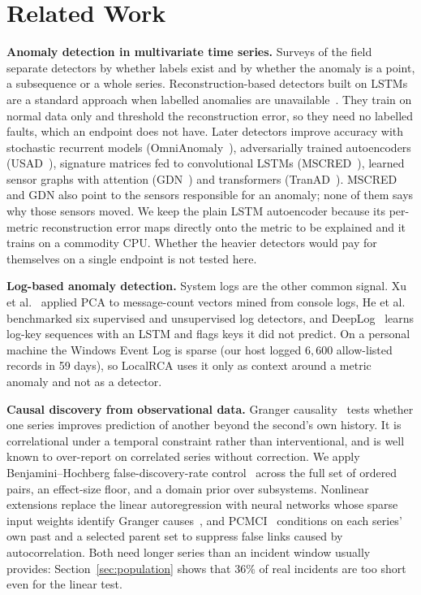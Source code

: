 \documentclass[conference,a4paper]{IEEEtran}
\begin{document}
\section{Related Work}

\textbf{Anomaly detection in multivariate time series.} Surveys of the
field~\cite{chandola2009survey, blazquez2021review} separate detectors by
whether labels exist and by whether the anomaly is a point, a subsequence or a
whole series. Reconstruction-based detectors built on LSTMs~\cite{hochreiter1997lstm}
are a standard approach when labelled anomalies are
unavailable~\cite{malhotra2016lstm, hundman2018detecting}. They train on
normal data only and threshold the reconstruction error, so they need no
labelled faults, which an endpoint does not have. Later detectors improve
accuracy with stochastic recurrent models
(OmniAnomaly~\cite{su2019omni}), adversarially trained autoencoders
(USAD~\cite{audibert2020usad}), signature matrices fed to convolutional LSTMs
(MSCRED~\cite{zhang2019mscred}), learned sensor graphs with attention
(GDN~\cite{deng2021gdn}) and transformers (TranAD~\cite{tuli2022tranad}).
MSCRED and GDN also point to the sensors responsible for an anomaly; none of
them says why those sensors moved. We keep the plain LSTM autoencoder because
its per-metric reconstruction error maps directly onto the metric to be
explained and it trains on a commodity CPU. Whether the heavier detectors
would pay for themselves on a single endpoint is not tested here.

\textbf{Log-based anomaly detection.} System logs are the other common
signal. Xu et al.~\cite{xu2009console} applied PCA to message-count vectors
mined from console logs, He et al.~\cite{he2016experience} benchmarked six
supervised and unsupervised log detectors, and DeepLog~\cite{du2017deeplog}
learns log-key sequences with an LSTM and flags keys it did not predict. On a
personal machine the Windows Event Log is sparse (our host logged
$6{,}600$ allow-listed records in 59 days), so LocalRCA uses it only as
context around a metric anomaly and not as a detector.

\textbf{Causal discovery from observational data.} Granger
causality~\cite{granger1969investigating} tests whether one series improves
prediction of another beyond the second's own history. It is correlational
under a temporal constraint rather than interventional, and is well known to
over-report on correlated series without correction. We apply
Benjamini--Hochberg false-discovery-rate control~\cite{benjamini1995controlling}
across the full set of ordered pairs, an effect-size floor, and a domain prior
over subsystems. Nonlinear extensions replace the linear autoregression with
neural networks whose sparse input weights identify Granger
causes~\cite{tank2022neural}, and PCMCI~\cite{runge2019pcmci} conditions on
each series' own past and a selected parent set to suppress false links caused
by autocorrelation. Both need longer series than an incident window usually
provides: Section~\ref{sec:population} shows that $36\%$ of real incidents are
too short even for the linear test.
\end{document}
